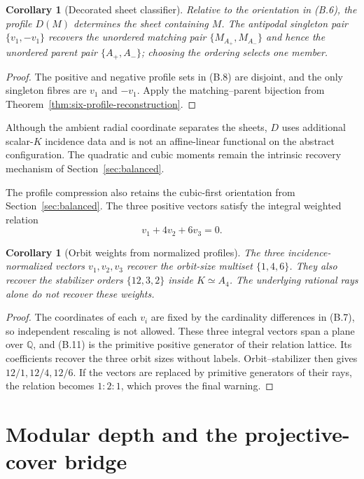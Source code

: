 \documentclass[11pt]{article}
\newtheorem{corollary}[theorem]{Corollary}
\theoremstyle{definition}
\theoremstyle{remark}
\begin{document}
\begin{corollary}[Decorated sheet classifier]
\label{cor:decorated-sheet-classifier}
Relative to the orientation in (B.6), the profile \(D(M)\) determines
the sheet containing \(M\).  The antipodal singleton pair
\(\{v_1,-v_1\}\) recovers the unordered matching pair
\(\{M_{A_+},M_{A_-}\}\) and hence the unordered parent pair
\(\{A_+,A_-\}\); choosing the ordering selects one member.
\end{corollary}

\begin{proof}
The positive and negative profile sets in (B.8) are disjoint, and the
only singleton fibres are \(v_1\) and \(-v_1\).  Apply the
matching--parent bijection from
Theorem~\ref{thm:six-profile-reconstruction}.
\end{proof}

Although the ambient radial coordinate separates the sheets, \(D\) uses
additional scalar-\(K\) incidence data and is not an affine-linear functional
on the abstract configuration.  The quadratic and cubic moments remain the
intrinsic recovery mechanism of Section~\ref{sec:balanced}.

The profile compression also retains the cubic-first orientation from
Section~\ref{sec:balanced}.  The three positive vectors satisfy the
integral weighted relation
\[
 v_1+4v_2+6v_3=0.                                       \tag{B.11}
\]
\begin{corollary}[Orbit weights from normalized profiles]
\label{cor:profile-ray-weights}
The three incidence-normalized vectors \(v_1,v_2,v_3\) recover the
orbit-size multiset \(\{1,4,6\}\).  They also recover the stabilizer
orders \(\{12,3,2\}\) inside \(K\simeq A_4\).  The underlying rational
rays alone do not recover these weights.
\end{corollary}

\begin{proof}
The coordinates of each \(v_i\) are fixed by the cardinality
differences in (B.7), so independent rescaling is not allowed.  These
three integral vectors span a plane over \(\mathbb Q\), and (B.11) is
the primitive positive generator of their relation lattice.  Its
coefficients recover the three orbit sizes without labels.
Orbit--stabilizer then gives \(12/1,12/4,12/6\).  If the vectors are
replaced by primitive generators of their rays, the relation becomes
\(1:2:1\), which proves the final warning.
\end{proof}

\section{Modular depth and the projective-cover bridge}
\label{sec:modular-depth}
\end{document}
